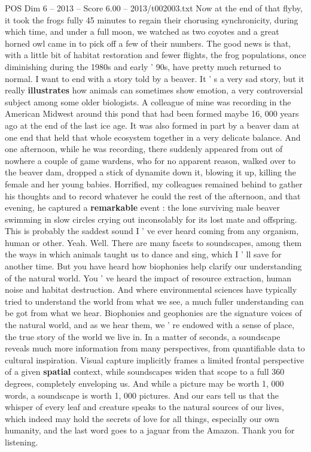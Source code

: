 \begin{textsample}{POS Dim 6 – 2013 – Score 6.00 – 2013/t002003.txt}
Now at the end of that flyby, it took the frogs fully 45 minutes to regain their chorusing synchronicity, during which time, and under a full moon, we watched as two coyotes and a great horned owl came in to pick off a few of their numbers.
The good news is that, with a little bit of habitat restoration and fewer flights, the frog populations, once diminishing during the 1980s and early ' 90s, have pretty much returned to normal.
I want to end with a story told by a beaver.
It ' s a very sad story, but it really \textbf{illustrates} how animals can sometimes show emotion, a very controversial subject among some older biologists.
A colleague of mine was recording in the American Midwest around this pond that had been formed maybe 16, 000 years ago at the end of the last ice age.
It was also formed in part by a beaver dam at one end that held that whole ecosystem together in a very delicate balance.
And one afternoon, while he was recording, there suddenly appeared from out of nowhere a couple of game wardens, who for no apparent reason, walked over to the beaver dam, dropped a stick of dynamite down it, blowing it up, killing the female and her young babies.
Horrified, my colleagues remained behind to gather his thoughts and to record whatever he could the rest of the afternoon, and that evening, he captured a \textbf{remarkable} event : the lone surviving male beaver swimming in slow circles crying out inconsolably for its lost mate and offspring.
This is probably the saddest sound I ' ve ever heard coming from any organism, human or other.
Yeah.
Well.
There are many facets to soundscapes, among them the ways in which animals taught us to dance and sing, which I ' ll save for another time.
But you have heard how biophonies help clarify our understanding of the natural world.
You ' ve heard the impact of resource extraction, human noise and habitat destruction.
And where environmental sciences have typically tried to understand the world from what we see, a much fuller understanding can be got from what we hear.
Biophonies and geophonies are the signature voices of the natural world, and as we hear them, we ' re endowed with a sense of place, the true story of the world we live in.
In a matter of seconds, a soundscape reveals much more information from many perspectives, from quantifiable data to cultural inspiration.
Visual capture implicitly frames a limited frontal perspective of a given \textbf{spatial} context, while soundscapes widen that scope to a full 360 degrees, completely enveloping us.
And while a picture may be worth 1, 000 words, a soundscape is worth 1, 000 pictures.
And our ears tell us that the whisper of every leaf and creature speaks to the natural sources of our lives, which indeed may hold the secrets of love for all things, especially our own humanity, and the last word goes to a jaguar from the Amazon.
Thank you for listening.

\end{textsample}

